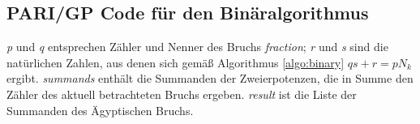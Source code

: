 \subsection{PARI/GP Code für den Binäralgorithmus}
\emph{p} und \emph{q} entsprechen Zähler und Nenner des Bruchs \emph{fraction}; \emph{r} und \emph{s} sind die natürlichen Zahlen, aus denen sich gemäß Algorithmus \ref{algo:binary} $qs+r = pN_k$ ergibt. \emph{summands} enthält die Summanden der Zweierpotenzen, die in Summe den Zähler des aktuell betrachteten Bruchs ergeben. \emph{result} ist die Liste der Summanden des Ägyptischen Bruchs.
